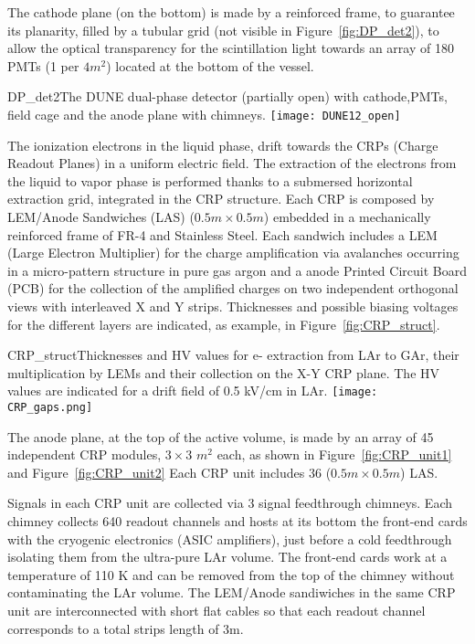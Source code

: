 The cathode plane (on the bottom) is made by a reinforced frame, to guarantee its planarity, filled by a tubular grid (not visible in Figure~\ref{fig:DP_det2}), to allow the optical transparency for the scintillation light towards an array of 180 PMTs (1 per $4m^2$) located at the bottom of the vessel.

\begin{cdrfigure}{DP_det2}{The DUNE dual-phase detector (partially open) with cathode,PMTs, field cage and the anode plane with chimneys.}
\texttt{[image: DUNE12\_open]}
\end{cdrfigure}

The ionization electrons in the liquid phase, drift towards the CRPs (Charge Readout Planes)  in a uniform electric field. The extraction of the electrons from the liquid to vapor phase is performed thanks to a submersed horizontal extraction grid, integrated in the  CRP structure.  Each CRP is composed by LEM/Anode Sandwiches (LAS) ($0.5m\times 0.5m$) embedded in  a mechanically reinforced frame of FR-4 and Stainless Steel.  Each sandwich includes a  LEM (Large Electron Multiplier) for the charge amplification via avalanches occurring in a micro-pattern structure in pure gas argon and a anode Printed Circuit Board (PCB) for the collection of the amplified charges on two independent orthogonal views with interleaved X and Y strips.  Thicknesses and possible biasing voltages for the different layers are indicated, as example, in Figure~\ref{fig:CRP_struct}. 

\begin{cdrfigure}{CRP_struct}{Thicknesses and HV values for e- extraction from LAr to GAr, their multiplication by LEMs and their collection on the X-Y CRP plane. The HV values are indicated for a drift field of 0.5 kV/cm in LAr.}
\texttt{[image: CRP\_gaps.png]}
\end{cdrfigure}

The anode plane, at the top of the active volume, is made by an array of 45 independent CRP modules, $3\times3$ $m^2$ each, as shown in Figure~\ref{fig:CRP_unit1} and Figure~\ref{fig:CRP_unit2} Each CRP unit includes 36 ($0.5m\times 0.5m$) LAS. 

Signals in each CRP unit are collected via 3 signal feedthrough chimneys. Each chimney collects 640 readout channels and hosts at its bottom the front-end cards with the cryogenic electronics (ASIC amplifiers), just before a cold feedthrough isolating them from the ultra-pure LAr volume. The front-end cards work at a temperature of 110 K and can be removed from the top of the chimney without contaminating the LAr volume. The LEM/Anode sandiwiches in the same CRP unit are interconnected with short flat cables so that each readout channel corresponds to a total strips length of 3m.
  
